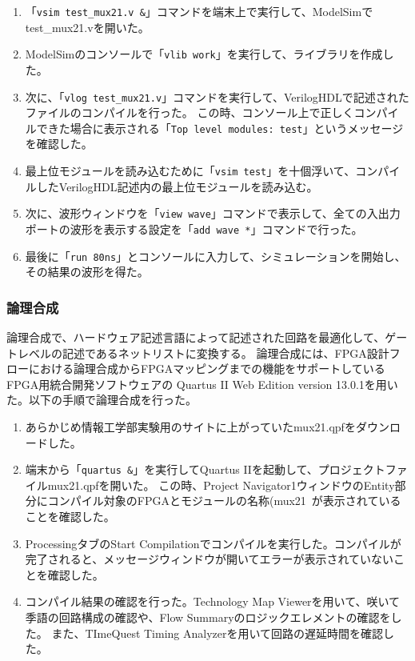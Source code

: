 \documentclass[uplatex]{jsarticle}
\begin{document}
\begin{enumerate}
  \item 「{\tt vsim test\_mux21.v &}」コマンドを端末上で実行して、ModelSimでtest\_mux21.vを開いた。
  \item ModelSimのコンソールで「{\tt vlib work}」を実行して、ライブラリを作成した。
  \item 
    次に、「{\tt vlog test\_mux21.v}」コマンドを実行して、VerilogHDLで記述されたファイルのコンパイルを行った。
    この時、コンソール上で正しくコンパイルできた場合に表示される「{\tt Top level modules: test}」というメッセージを確認した。
  \item 最上位モジュールを読み込むために「{\tt vsim test}」を十個浮いて、コンパイルしたVerilogHDL記述内の最上位モジュールを読み込む。
  \item 次に、波形ウィンドウを「{\tt view wave}」コマンドで表示して、全ての入出力ポートの波形を表示する設定を「{\tt add wave *}」コマンドで行った。
  \item 最後に「{\tt run 80ns}」とコンソールに入力して、シミュレーションを開始し、その結果の波形を得た。
\end{enumerate}

\subsubsection{論理合成}

論理合成で、ハードウェア記述言語によって記述された回路を最適化して、ゲートレベルの記述であるネットリストに変換する。
論理合成には、FPGA設計フローにおける論理合成からFPGAマッピングまでの機能をサポートしているFPGA用統合開発ソフトウェアの
Quartus II Web Edition version 13.0.1を用いた。以下の手順で論理合成を行った。

\begin{enumerate}
  \item あらかじめ情報工学部実験用のサイトに上がっていたmux21.qpfをダウンロードした。
  \item 端末から「{\tt quartus &}」を実行してQuartus IIを起動して、プロジェクトファイルmux21.qpfを開いた。
        この時、Project Navigator1ウィンドウのEntity部分にコンパイル対象のFPGAとモジュールの名称(mux21~が表示されていることを確認した。
  \item ProcessingタブのStart Compilationでコンパイルを実行した。コンパイルが完了されると、メッセージウィンドウが開いてエラーが表示されていないことを確認した。
  \item コンパイル結果の確認を行った。Technology Map Viewerを用いて、咲いて季語の回路構成の確認や、Flow Summaryのロジックエレメントの確認をした。
        また、TImeQuest Timing Analyzerを用いて回路の遅延時間を確認した。
\end{enumerate}
\end{document}
